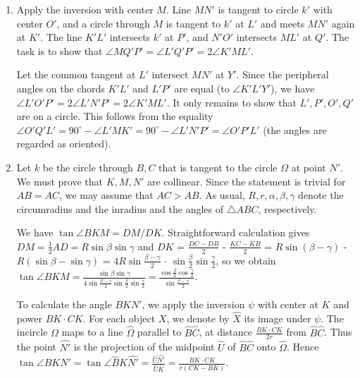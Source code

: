 \documentclass[11pt,a4paper]{article}
\begin{document}
\begin{enumerate}
\item Apply the inversion with center $M$. Line $MN'$ is tangent to circle $k'$ with center $O'$, and a circle through $M$ is tangent to $k'$ at $L'$ and meets $MN'$ again at $K'$. The line $K'L'$ intersects $k'$ at $P'$, and $N'O'$ intersects $ML'$ at $Q'$. The task is to show that $\angle MQ\prime P\prime = \angle L\prime Q\prime P\prime =2\angle K\prime ML\prime$.

Let the common tangent at $L'$ intersect $MN'$ at $Y'$. Since the peripheral angles on the chords $K'L'$ and $L'P'$ are equal (to $\angle K'L'Y'$), we have $\angle L\prime O\prime P\prime =2\angle L\prime N\prime P\prime =2\angle
K\prime ML\prime$. It only remains to show that $L',P',O',Q'$ are on a circle. This follows from the equality $\angle O\prime Q\prime L\prime =90^{\circ}- \angle
L\prime MK\prime =90^{\circ}-\angle L\prime N\prime P\prime =\angle O\prime P\prime L\prime$ (the angles are regarded as oriented). 

\item Let $k$ be the circle through $B,C$ that is tangent to the circle $\Omega$ at point $N'$. We must prove that $K,M,N'$ are collinear. Since the statement is trivial for $AB=AC$, we may assume that $AC>AB$. As usual, $R,r,\alpha,\beta,\gamma$ denote the circumradius and the inradius and the angles of $\triangle ABC$, respectively.

We have $\tan\angle BKM=DM/DK$. Straightforward calculation gives $DM=\frac12AD=R\sin\beta\sin\gamma$ and $DK$ = $\frac{DC-DB}2$ - $\frac
{KC-KB}2$ = $R\sin(\beta-\gamma)$ - $R(\sin\beta-\sin\gamma)$ = $4R\sin\frac
{\beta-\gamma}2$ $\cdot$ $\sin\frac{\beta}2\sin\frac{\gamma}2$, so we obtain $\tan\angle BKM=\frac{\sin\beta\sin\gamma}
{4\sin\frac{\beta-\gamma}2\sin\frac{\beta}2\sin\frac{\gamma}2}=
\frac{\cos\frac{\beta}2\cos\frac{\gamma}2}{\sin\frac{\beta-\gamma}
2}.$

To calculate the angle $BKN'$, we apply the inversion $\psi$ with center at $K$ and power $BK\cdot CK$. For each object $X$, we denote by $\widehat{X}$ its image under $\psi$. The incircle $\Omega$ maps to a line $\widehat{\Omega}$ parallel to $\widehat{B}\widehat{C}$, at distance $\frac{BK\cdot CK}{2r}$ from $\widehat{B}\widehat{C}$. Thus the point $\widehat{N\prime }$ is the projection of the midpoint $\widehat{U}$ of $\widehat{B}\widehat{C}$ onto $\widehat{\Omega}$. Hence $\tan\angle BKN\prime =\tan
\angle\widehat{B}K\widehat{N\prime }=\frac{\widehat{U}\widehat{N\prime }}
{\widehat{U}K}=\frac{BK\cdot CK}{r(CK-BK)}.$ 


\end{enumerate}
\end{document}
